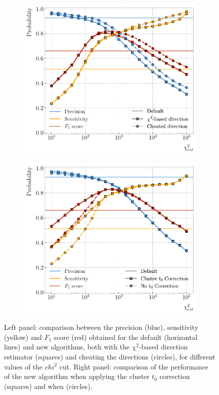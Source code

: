 \begin{figure}[t]
	\begin{subfigure}{0.5\textwidth}
		\centering
		\includegraphics[width=.90\linewidth]{Images/GArSoft_PID/associations/helix_propagation_metrics_no_t0.pdf}
	\end{subfigure}
	\begin{subfigure}{0.5\textwidth}
		\centering
		\includegraphics[width=.90\linewidth]{Images/GArSoft_PID/associations/helix_propagation_metrics_ecal.pdf}
	\end{subfigure}
	\caption{Left panel: comparison between the precision (blue), sensitivity (yellow) and $F_{1}$ score (red) obtained for the default (horizontal lines) and new algorithms, both with the $\chi^{2}$-based direction estimator (squares) and cheating the directions (circles), for different values of the $chi^{2}$ cut. Right panel: comparison of the performance of the new algorithm when applying the cluster $t_{0}$ correction (squares) and when (circles).}
	\label{fig:associations}
\end{figure}

